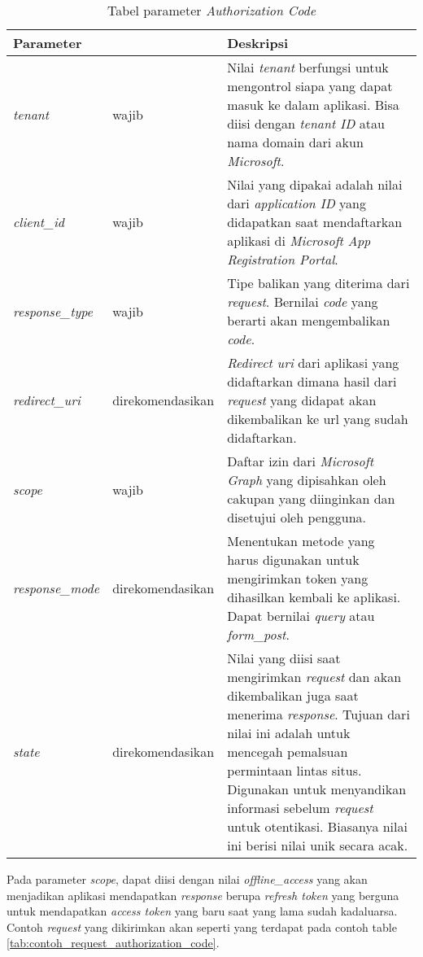 \documentclass[a4paper,twoside]{article}
\begin{document}
\begin{enumerate}
\begin{table}[H]
	\centering 
	\caption{Tabel parameter \textit{Authorization Code}}
	\label{tab:parameter_authorization_code}
	\begin{tabular}{|p{3cm}|p{3cm}|p{9cm}|}
	\hline
	\textbf{Parameter} & & \textbf{Deskripsi}\\ \hline 
	\textit{tenant} & wajib & Nilai \textit{tenant} berfungsi untuk mengontrol siapa yang dapat masuk ke dalam aplikasi. Bisa diisi dengan \textit{tenant ID} atau nama domain dari akun \textit{Microsoft}.\\ \hline 
	\textit{client\_id} & wajib & Nilai yang dipakai adalah nilai dari \textit{application ID} yang didapatkan saat mendaftarkan aplikasi di \textit{Microsoft App Registration Portal}.\\ \hline 
	\textit{response\_type} & wajib & Tipe balikan yang diterima dari \textit{request}. Bernilai 				\textit{code} yang berarti akan mengembalikan \textit{code}. \\ \hline 
	\textit{redirect\_uri} & direkomendasikan & \textit{Redirect uri} dari aplikasi yang didaftarkan dimana hasil dari \textit{request} yang didapat akan dikembalikan ke url yang sudah didaftarkan. \\ \hline 
	\textit{scope} & wajib & Daftar izin dari \textit{Microsoft Graph} yang dipisahkan oleh cakupan yang diinginkan dan disetujui oleh pengguna. \\ \hline 
\textit{response\_mode} & direkomendasikan & Menentukan metode yang harus digunakan untuk mengirimkan token yang dihasilkan kembali ke aplikasi. Dapat bernilai \textit{query} atau \textit{form\_post}. \\ \hline 
	\textit{state} & direkomendasikan & Nilai yang diisi saat mengirimkan \textit{request} dan akan dikembalikan juga saat menerima \textit{response}. Tujuan dari nilai ini adalah untuk mencegah pemalsuan permintaan lintas situs. Digunakan untuk menyandikan informasi sebelum \textit{request} untuk otentikasi. Biasanya nilai ini berisi nilai unik secara acak. \\ \hline
\end{tabular}  
\end{table}

Pada parameter \textit{scope}, dapat diisi dengan nilai \textit{offline\_access} yang akan menjadikan aplikasi mendapatkan \textit{response} berupa \textit{refresh token} yang berguna untuk mendapatkan \textit{access token} yang baru saat yang lama sudah kadaluarsa. Contoh \textit{request} yang dikirimkan akan seperti yang terdapat pada contoh table \ref{tab:contoh_request_authorization_code}.


\end{enumerate}
\end{document}
